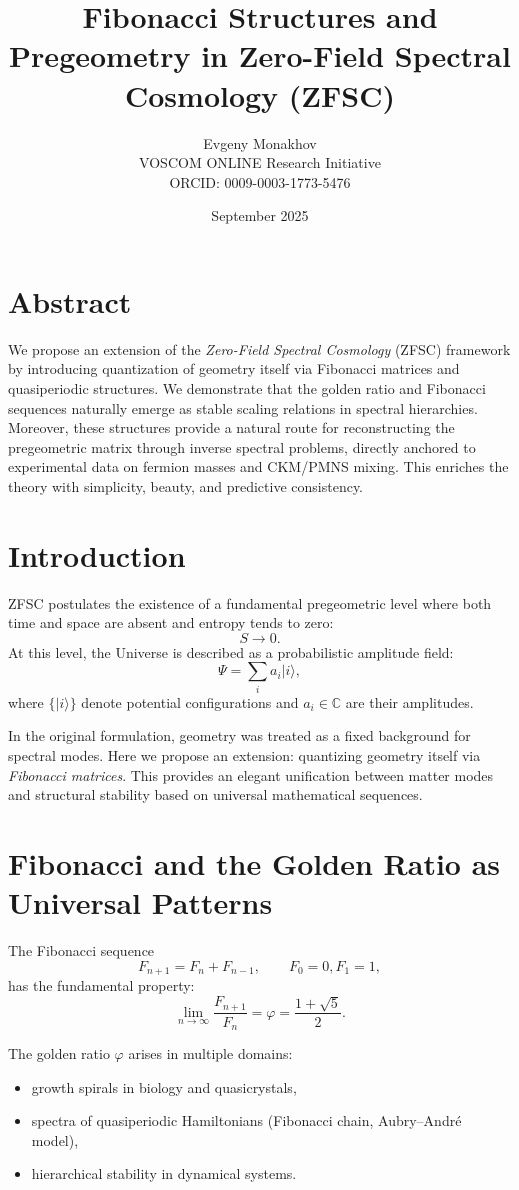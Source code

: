 \documentclass[12pt,a4paper]{article}
\title{Fibonacci Structures and Pregeometry in Zero-Field Spectral Cosmology (ZFSC)}
\author{Evgeny Monakhov \\ VOSCOM ONLINE Research Initiative \\ ORCID: 0009-0003-1773-5476}
\date{September 2025}
\begin{document}
\maketitle

\section*{Abstract}
We propose an extension of the \emph{Zero-Field Spectral Cosmology} (ZFSC) framework by introducing quantization of geometry itself via Fibonacci matrices and quasiperiodic structures. We demonstrate that the golden ratio and Fibonacci sequences naturally emerge as stable scaling relations in spectral hierarchies. Moreover, these structures provide a natural route for reconstructing the pregeometric matrix through inverse spectral problems, directly anchored to experimental data on fermion masses and CKM/PMNS mixing. This enriches the theory with simplicity, beauty, and predictive consistency.

\section{Introduction}
ZFSC postulates the existence of a fundamental pregeometric level where both time and space are absent and entropy tends to zero:
\[
S \to 0.
\]
At this level, the Universe is described as a probabilistic amplitude field:
\[
\Psi = \sum_{i} a_i |i\rangle ,
\]
where $\{|i\rangle\}$ denote potential configurations and $a_i\in \mathbb{C}$ are their amplitudes.

In the original formulation, geometry was treated as a fixed background for spectral modes. Here we propose an extension: quantizing geometry itself via \emph{Fibonacci matrices}. This provides an elegant unification between matter modes and structural stability based on universal mathematical sequences.

\section{Fibonacci and the Golden Ratio as Universal Patterns}
The Fibonacci sequence
\[
F_{n+1} = F_n + F_{n-1}, \qquad F_0=0, F_1=1,
\]
has the fundamental property:
\[
\lim_{n\to\infty} \frac{F_{n+1}}{F_n} = \varphi = \frac{1+\sqrt{5}}{2}.
\]

The golden ratio $\varphi$ arises in multiple domains:
\begin{itemize}
    \item growth spirals in biology and quasicrystals,
    \item spectra of quasiperiodic Hamiltonians (Fibonacci chain, Aubry–André model),
    \item hierarchical stability in dynamical systems.
\end{itemize}
\end{document}
